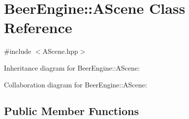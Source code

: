 \hypertarget{class_beer_engine_1_1_a_scene}{}\section{Beer\+Engine\+:\+:A\+Scene Class Reference}
\label{class_beer_engine_1_1_a_scene}


{\ttfamily \#include $<$A\+Scene.\+hpp$>$}



Inheritance diagram for Beer\+Engine\+:\+:A\+Scene\+:


Collaboration diagram for Beer\+Engine\+:\+:A\+Scene\+:
\subsection*{Public Member Functions}
